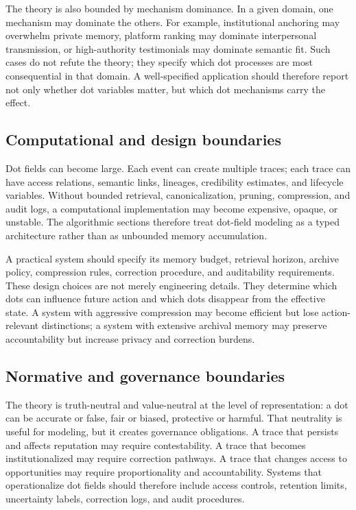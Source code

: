 \documentclass[11pt]{article}
\theoremstyle{remark}
\begin{document}
The theory is also bounded by mechanism dominance. In a given domain, one mechanism may dominate the others. For example, institutional anchoring may overwhelm private memory, platform ranking may dominate interpersonal transmission, or high-authority testimonials may dominate semantic fit. Such cases do not refute the theory; they specify which dot processes are most consequential in that domain. A well-specified application should therefore report not only whether dot variables matter, but which dot mechanisms carry the effect.

\subsection{Computational and design boundaries}\label{boundary-computational-design}

Dot fields can become large. Each event can create multiple traces; each trace can have access relations, semantic links, lineages, credibility estimates, and lifecycle variables. Without bounded retrieval, canonicalization, pruning, compression, and audit logs, a computational implementation may become expensive, opaque, or unstable. The algorithmic sections therefore treat dot-field modeling as a typed architecture rather than as unbounded memory accumulation.

A practical system should specify its memory budget, retrieval horizon, archive policy, compression rules, correction procedure, and auditability requirements. These design choices are not merely engineering details. They determine which dots can influence future action and which dots disappear from the effective state. A system with aggressive compression may become efficient but lose action-relevant distinctions; a system with extensive archival memory may preserve accountability but increase privacy and correction burdens.

\subsection{Normative and governance boundaries}\label{boundary-governance-limits}

The theory is truth-neutral and value-neutral at the level of representation: a dot can be accurate or false, fair or biased, protective or harmful. That neutrality is useful for modeling, but it creates governance obligations. A trace that persists and affects reputation may require contestability. A trace that becomes institutionalized may require correction pathways. A trace that changes access to opportunities may require proportionality and accountability. Systems that operationalize dot fields should therefore include access controls, retention limits, uncertainty labels, correction logs, and audit procedures.
\end{document}
